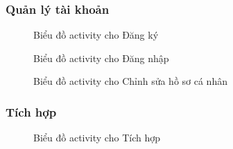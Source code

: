 \subsubsection{Quản lý tài khoản}
\begin{figure}[H]
    \centering
     
    \vspace{0.5cm}
    \caption{Biểu đồ activity cho Đăng ký}
    \label{fig:enter-label}
\end{figure}
\begin{figure}[H]
    \centering
     
    \vspace{0.5cm}
    \caption{Biểu đồ activity cho Đăng nhập}
    \label{fig:enter-label}
\end{figure}
\begin{figure}[H]
    \centering
     
    \vspace{0.5cm}
    \caption{Biểu đồ activity cho Chỉnh sửa hồ sơ cá nhân}
    \label{fig:enter-label}
\end{figure}
\subsubsection{Tích hợp}
\begin{figure}[H]
    \centering
     
    \vspace{0.5cm}
    \caption{Biểu đồ activity cho Tích hợp}
    \label{fig:enter-label}
\end{figure}
